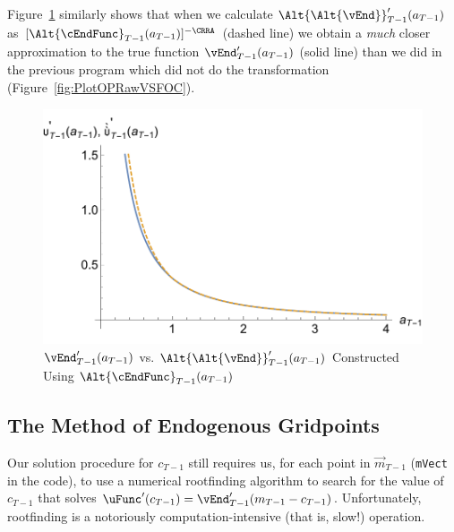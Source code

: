 \documentclass[titlepage, headings=optiontotocandhead]{\econtex}
\begin{document}
Figure~\ref{fig:GothVVSGothCInv} similarly shows that when we calculate
$\Alt{\Alt{\vEnd}}_{T-1}^{\prime}({a}_{T-1})$ as
$[\Alt{\cEndFunc}_{T-1}({a}_{T-1})]^{-\CRRA}$ (dashed line) we
obtain a \textit{much} closer approximation to the true function
$\vEnd_{T-1}^{\prime}({a}_{T-1})$ (solid line) than we did in
the previous  program which did not do the
transformation (Figure~\ref{fig:PlotOPRawVSFOC}).

\hypertarget{GothVVSGothCInv}{}
\begin{figure}
  \includegraphics{./Figures/GothVVSGothCInv}
  \caption{$\vEnd_{T-1}^{\prime}({a}_{T-1})$ vs. $\Alt{\Alt{\vEnd}}_{T-1}^{\prime}({a}_{T-1})$ Constructed Using $\Alt{\cEndFunc}_{T-1}({a}_{T-1})$}
  \label{fig:GothVVSGothCInv}
\end{figure}



\hypertarget{The-Method-of-Endogenous-Gridpoints}{}
\subsection{The Method of Endogenous Gridpoints}

Our solution procedure for ${c}_{T-1}$ still requires us, for each
point in $\vec{m}_{T-1}$ (\texttt{mVect} in the code), to use a
numerical rootfinding algorithm to search for the value of ${c}_{T-1}$
that solves $\uFunc^{\prime}({c}_{T-1}) =
\vEnd_{T-1}^{\prime}({m}_{T-1}-{c}_{T-1})$.  Unfortunately, rootfinding
is a notoriously computation-intensive (that is, slow!) operation.
\end{document}
